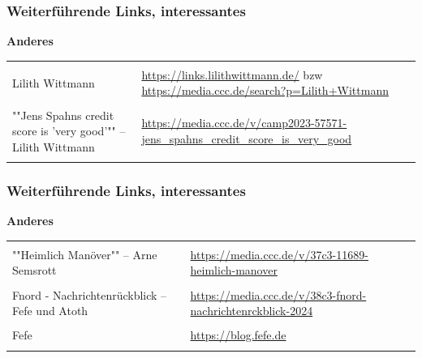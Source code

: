 \begin{frame}
    \frametitle{Weiterführende Links, interessantes}

    \textbf{\large Anderes}

    \begin{table}[H]
        \begin{tabularx}{\linewidth}{|lX|}
            &\\
            Lilith Wittmann&\url{https://links.lilithwittmann.de/} bzw \url{https://media.ccc.de/search?p=Lilith+Wittmann}\\
            &\\
            \parbox{.4\linewidth}{""Jens Spahns credit score is 'very good'"" -- Lilith Wittmann}&\url{https://media.ccc.de/v/camp2023-57571-jens\_spahns\_credit\_score\_is\_very\_good}\\
            &\\
        \end{tabularx}
    \end{table}

\end{frame}

\begin{frame}
    \frametitle{Weiterführende Links, interessantes}

    \textbf{\large Anderes}

    \begin{table}[H]
        \begin{tabularx}{\linewidth}{|lX|}
            &\\
            \parbox{.4\linewidth}{""Heimlich Manöver"" -- Arne Semsrott}&\url{https://media.ccc.de/v/37c3-11689-heimlich-manover}\\
            &\\
            Fnord - Nachrichtenrückblick -- Fefe und Atoth&\url{https://media.ccc.de/v/38c3-fnord-nachrichtenrckblick-2024}\\
            &\\
            Fefe&\url{https://blog.fefe.de}\\
            &\\
        \end{tabularx}
    \end{table}

\end{frame}


